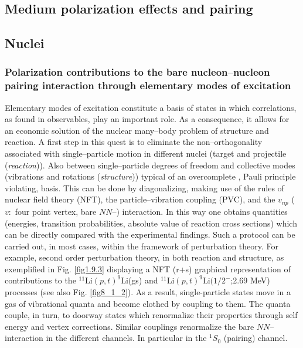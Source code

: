 \begin{subappendices}
\section{Medium polarization effects and pairing}\label{C3AppEx}
\subsection{Nuclei}
\subsubsection{Polarization contributions to the bare nucleon--nucleon pairing interaction through elementary modes of excitation}
Elementary modes of excitation constitute a basis of states in which correlations, as found in observables, play an important role. As a consequence, it allows for an economic solution of the nuclear many--body problem of structure and reaction. A first step in this quest is to eliminate the non--orthogonality associated with single--particle motion in different nuclei (target and projectile (\textit{reaction})). Also between single--particle degrees of freedom and collective modes (vibrations and rotations (\textit{structure})) typical of an overcomplete , Pauli principle violating, basis. This can be done by diagonalizing, making use of the rules of nuclear field theory (NFT), the particle--vibration coupling (PVC), and the $v_{np}$ ($v:$ four point vertex, bare $NN$--) interaction. In this way one obtains quantities (energies, transition probabilities, absolute value of reaction cross sections) which can be directly compared with the experimental findings.
Such a protocol can be carried out, in most cases, within the framework of  perturbation theory. For example, second order perturbation theory, in both reaction and structure, as exemplified in Fig. \ref{fig1.9.3} displaying a NFT (r+s) graphical representation of contributions to the $^{11}$Li$(p,t)^{9}$Li(gs) and $^{11}$Li$(p,t)^{9}$Li$(1/2^-$;2.69 MeV) processes (see also Fig. \ref{fig8_1_2}).
As a result, single-particle states move in a gas of vibrational quanta and become clothed by coupling to them. The quanta couple, in turn, to doorway states  which renormalize their properties through self energy and vertex corrections. Similar couplings renormalize the bare $NN$--interaction in the different channels. In particular in the $^1S_0$ (pairing) channel.



\end{subappendices}
